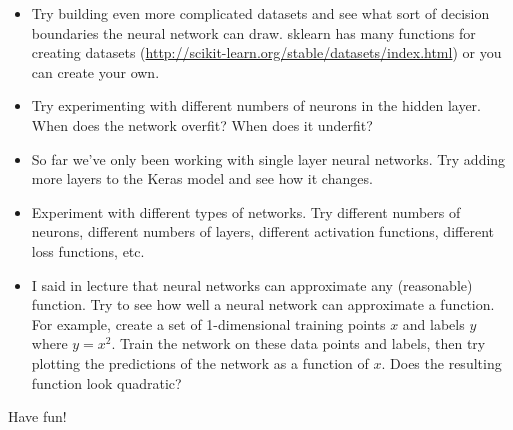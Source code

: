 \documentclass{article}
\begin{document}
\begin{itemize}
    \item Try building even more complicated datasets and see what sort of decision boundaries the neural network can draw. sklearn has many functions for creating datasets (\url{http://scikit-learn.org/stable/datasets/index.html}) or you can create your own.
    
    \item Try experimenting with different numbers of neurons in the hidden layer. When does the network overfit? When does it underfit?
    
    \item So far we've only been working with single layer neural networks. Try adding more layers to the Keras model and see how it changes.
    
    \item Experiment with different types of networks. Try different numbers of neurons, different numbers of layers, different activation functions, different loss functions, etc.
    
    \item I said in lecture that neural networks can approximate any (reasonable) function. Try to see how well a neural network can approximate a function. For example, create a set of 1-dimensional training points $x$ and labels $y$ where $y = x^2$. Train the network on these data points and labels, then try plotting the predictions of the network as a function of $x$. Does the resulting function look quadratic?
\end{itemize}

Have fun!
\end{document}

